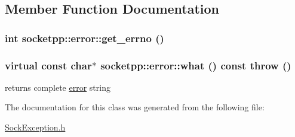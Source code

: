 \subsection{Member Function Documentation}
\hypertarget{classsocketpp_1_1error_e1d23816909f2663b5553d232110442b}{
\subsubsection[{get\_\-errno}]{\setlength{\rightskip}{0pt plus 5cm}int socketpp::error::get\_\-errno ()}}
\label{classsocketpp_1_1error_e1d23816909f2663b5553d232110442b}


\hypertarget{classsocketpp_1_1error_4b03541ebad2b9d0b73222cd505ea50f}{
\subsubsection[{what}]{\setlength{\rightskip}{0pt plus 5cm}virtual const char$\ast$ socketpp::error::what () const  throw ()}}
\label{classsocketpp_1_1error_4b03541ebad2b9d0b73222cd505ea50f}


returns complete \hyperlink{classsocketpp_1_1error}{error} string 



The documentation for this class was generated from the following file:\begin{CompactItemize}
\item 
\hyperlink{SockException_8h}{SockException.h}\end{CompactItemize}
